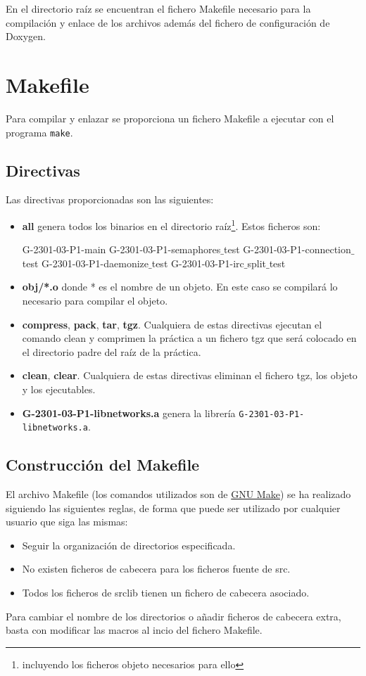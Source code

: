 \documentclass{mathnotes}
\begin{document}
En el directorio raíz se encuentran el fichero Makefile necesario para la compilación y enlace de los archivos además del fichero de configuración de Doxygen.

\section{Makefile}
Para compilar y enlazar se proporciona un fichero Makefile a ejecutar con el programa \texttt{make}.

\subsection{Directivas}
Las directivas proporcionadas son las siguientes:

\begin{itemize}
\item \textbf{all} genera todos los binarios en el directorio raíz\footnote{incluyendo los ficheros objeto necesarios para ello}. Estos ficheros son:

\subitem G-2301-03-P1-main
\subitem G-2301-03-P1-semaphores$\_$test
\subitem G-2301-03-P1-connection$\_$test
\subitem G-2301-03-P1-daemonize$\_$test
\subitem G-2301-03-P1-irc$\_$split$\_$test

\item \textbf{obj/*.o} donde * es el nombre de un objeto. En este caso se compilará lo necesario para compilar el objeto.

\item \textbf{compress}, \textbf{pack}, \textbf{tar}, \textbf{tgz}. Cualquiera de estas directivas ejecutan el comando clean y comprimen la práctica a un fichero tgz que será colocado en el directorio padre del raíz de la práctica.

\item \textbf{clean}, \textbf{clear}. Cualquiera de estas directivas eliminan el fichero tgz, los objeto y los ejecutables.

\item\textbf{G-2301-03-P1-libnetworks.a} genera la librería \texttt{G-2301-03-P1-libnetworks.a}.
\end{itemize}

\subsection{Construcción del Makefile}
El archivo Makefile (los comandos utilizados son de \href{https://www.gnu.org/software/make/manual/make.html#Top}{GNU Make}) se ha realizado siguiendo las siguientes reglas, de forma que puede ser utilizado por cualquier usuario que siga las mismas:
\begin{itemize}
\item Seguir la organización de directorios especificada.
\item No existen ficheros de cabecera para los ficheros fuente de src.
\item Todos los ficheros de srclib tienen un fichero de cabecera asociado.
\end{itemize}
Para cambiar el nombre de los directorios o añadir ficheros de cabecera extra, basta con modificar las macros al incio del fichero Makefile.
\end{document}
